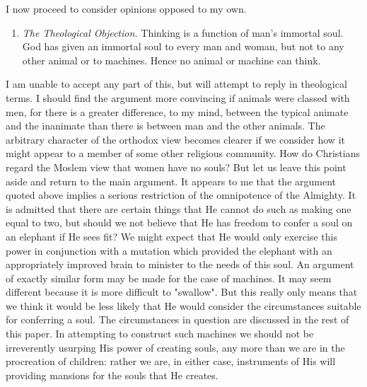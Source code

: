 \documentclass[12pt]{article}
\begin{document}
    I now proceed to consider opinions opposed to my own.

    \begin{enumerate}[label=(\arabic*)]
        \setcounter{enumi}{0}
        \item{\textit{The Theological Objection.} Thinking is a function of man's immortal soul. God has given an immortal soul to every man and woman, but not to any other animal or to machines. Hence no animal or machine can think.}
    \end{enumerate}


    I am unable to accept any part of this, but will attempt to reply in theological terms. I should find the argument more convincing if animals were classed with men, for there is a greater difference, to my mind, between the typical animate and the inanimate than there is between man and the other animals. The arbitrary character of the orthodox view becomes clearer if we consider how it might appear to a member of some other religious community. How do Christians regard the Moslem view that women have no souls? But let us leave this point aside and return to the main argument. It appears to me that the argument quoted above implies a serious restriction of the omnipotence of the Almighty. It is admitted that there are certain things that He cannot do such as making one equal to two, but should we not believe that He has freedom to confer a soul on an elephant if He sees fit? We might expect that He would only exercise this power in conjunction with a mutation which provided the elephant with an appropriately improved brain to minister to the needs of this soul. An argument of exactly similar form may be made for the case of machines. It may seem different because it is more difficult to "swallow". But this really only means that we think it would be less likely that He would consider the circumstances suitable for conferring a soul. The circumstances in question are discussed in the rest of this paper. In attempting to construct such machines we should not be irreverently usurping His power of creating souls, any more than we are in the procreation of children: rather we are, in either case, instruments of His will providing mansions for the souls that He creates.
\end{document}

